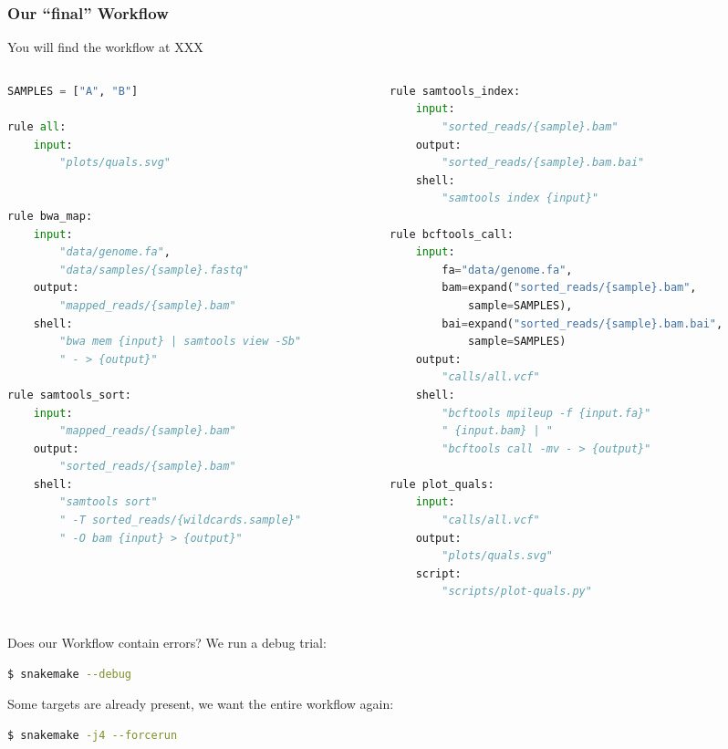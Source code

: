 \begin{frame}[fragile]
  \frametitle{Our ``final'' Workflow}
  You will find the workflow at XXX
  \begin{columns}
    \begin{column}{0.5\textwidth}
      \begin{lstlisting}[language=Python,style=Python,basicstyle=\tiny]
SAMPLES = ["A", "B"]

rule all:
    input:
        "plots/quals.svg"


rule bwa_map:
    input:
        "data/genome.fa",
        "data/samples/{sample}.fastq"
    output:
        "mapped_reads/{sample}.bam"
    shell:
        "bwa mem {input} | samtools view -Sb"
        " - > {output}"

rule samtools_sort:
    input:
        "mapped_reads/{sample}.bam"
    output:
        "sorted_reads/{sample}.bam"
    shell:
        "samtools sort"
        " -T sorted_reads/{wildcards.sample}"
        " -O bam {input} > {output}"
      \end{lstlisting}
    \end{column}
    \begin{column}{0.5\textwidth}
      \begin{lstlisting}[language=Python,style=Python,basicstyle=\tiny]
rule samtools_index:
    input:
        "sorted_reads/{sample}.bam"
    output:
        "sorted_reads/{sample}.bam.bai"
    shell:
        "samtools index {input}"

rule bcftools_call:
    input:
        fa="data/genome.fa",
        bam=expand("sorted_reads/{sample}.bam",
            sample=SAMPLES),
        bai=expand("sorted_reads/{sample}.bam.bai",
            sample=SAMPLES)
    output:
        "calls/all.vcf"
    shell:
        "bcftools mpileup -f {input.fa}"
        " {input.bam} | "
        "bcftools call -mv - > {output}"

rule plot_quals:
    input:
        "calls/all.vcf"
    output:
        "plots/quals.svg"
    script:
        "scripts/plot-quals.py"
      \end{lstlisting}
    \end{column}
  \end{columns}
\end{frame}

\begin{frame}[fragile]
  \frametitle{}
  Does our Workflow contain errors? We run a debug trial:
  \begin{lstlisting}[language=Bash, style=Shell]
$ snakemake --debug
  \end{lstlisting}
  \pause
  Some targets are already present, we want the entire workflow again:
  \begin{lstlisting}[language=Bash, style=Shell]
$ snakemake -j4 --forcerun
  \end{lstlisting}
\end{frame}


